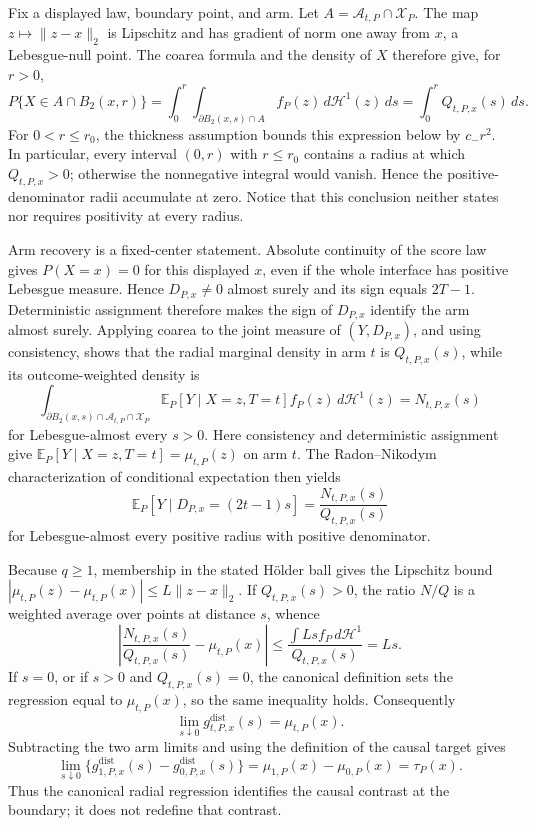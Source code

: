 Fix a displayed law, boundary point, and arm.  Let \(A=\mathcal A_{t,P}\cap\mathcal X_P\).  The map \(z\mapsto\lVert z-x\rVert_2\) is Lipschitz and has gradient of norm one away from \(x\), a Lebesgue-null point.  The coarea formula and the density of \(X\) therefore give, for \(r>0\),
\[
P\{X\in A\cap B_2(x,r)\}
=\int_0^r\int_{\partial B_2(x,s)\cap A}f_P(z)\,d\mathcal H^1(z)\,ds
=\int_0^rQ_{t,P,x}(s)\,ds.
\]
For \(0<r\leq r_0\), the thickness assumption bounds this expression below by \(c_-r^2\).  In particular, every interval \((0,r)\) with \(r\leq r_0\) contains a radius at which \(Q_{t,P,x}>0\); otherwise the nonnegative integral would vanish.  Hence the positive-denominator radii accumulate at zero.  Notice that this conclusion neither states nor requires positivity at every radius.

Arm recovery is a fixed-center statement.  Absolute continuity of the score law gives \(P(X=x)=0\) for this displayed \(x\), even if the whole interface has positive Lebesgue measure.  Hence \(D_{P,x}\ne0\) almost surely and its sign equals \(2T-1\).  Deterministic assignment therefore makes the sign of \(D_{P,x}\) identify the arm almost surely.  Applying coarea to the joint measure of \((Y,D_{P,x})\), and using consistency, shows that the radial marginal density in arm \(t\) is \(Q_{t,P,x}(s)\), while its outcome-weighted density is
\[
\int_{\partial B_2(x,s)\cap\mathcal A_{t,P}\cap\mathcal X_P}
\mathbb E_P[Y\mid X=z,T=t]f_P(z)\,d\mathcal H^1(z)
=N_{t,P,x}(s)
\]
for Lebesgue-almost every \(s>0\).  Here consistency and deterministic assignment give \(\mathbb E_P[Y\mid X=z,T=t]=\mu_{t,P}(z)\) on arm \(t\).  The Radon--Nikodym characterization of conditional expectation then yields
\[
\mathbb E_P[Y\mid D_{P,x}=(2t-1)s]
=\frac{N_{t,P,x}(s)}{Q_{t,P,x}(s)}
\]
for Lebesgue-almost every positive radius with positive denominator.

Because \(q\geq1\), membership in the stated H\"older ball gives the Lipschitz bound
\(|\mu_{t,P}(z)-\mu_{t,P}(x)|\leq L\lVert z-x\rVert_2\).  If \(Q_{t,P,x}(s)>0\), the ratio \(N/Q\) is a weighted average over points at distance \(s\), whence
\[
\left|\frac{N_{t,P,x}(s)}{Q_{t,P,x}(s)}-\mu_{t,P}(x)\right|
\leq\frac{\int Ls f_P\,d\mathcal H^1}{Q_{t,P,x}(s)}=Ls.
\]
If \(s=0\), or if \(s>0\) and \(Q_{t,P,x}(s)=0\), the canonical definition sets the regression equal to \(\mu_{t,P}(x)\), so the same inequality holds.  Consequently
\[
\lim_{s\downarrow0}g^{\mathrm{dist}}_{t,P,x}(s)=\mu_{t,P}(x).
\]
Subtracting the two arm limits and using the definition of the causal target gives
\[
\lim_{s\downarrow0}\{g^{\mathrm{dist}}_{1,P,x}(s)-g^{\mathrm{dist}}_{0,P,x}(s)\}
=\mu_{1,P}(x)-\mu_{0,P}(x)=\tau_P(x).
\]
Thus the canonical radial regression identifies the causal contrast at the boundary; it does not redefine that contrast.